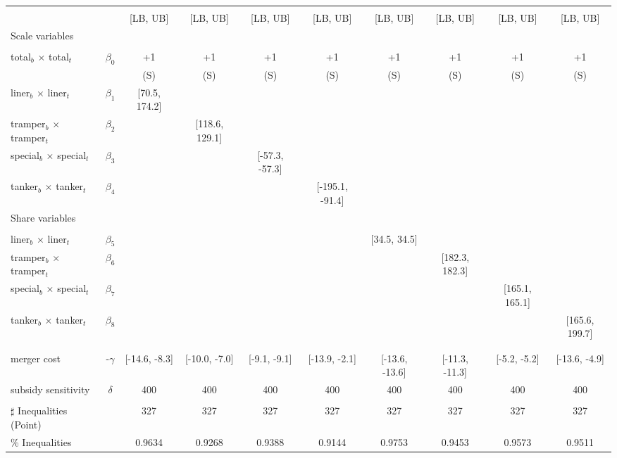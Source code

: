 \begin{tabular}{@{\extracolsep{5pt}}lccccccccc}
\toprule 
 &  &  &  &  &  &  &  &  &  \\
 &  & [LB, UB] & [LB, UB] & [LB, UB] & [LB, UB] & [LB, UB] & [LB, UB] & [LB, UB] & [LB, UB] \\
\midrule 
Scale variables &  &  &  &  &  &  &  \\
 &  &  &  &  &  &  &  &  \\
total$_{b}$ $\times$ total$_{t}$ & $\beta_0$ & +1 & +1 & +1 & +1 & +1 & +1 & +1 & +1 \\
 &  & (S) & (S) & (S) & (S) & (S) & (S) & (S) & (S) \\
liner$_{b}$ $\times$ liner$_{t}$ & $\beta_1$ & [70.5, 174.2] &  &  &  &  &  &  &  \\
tramper$_{b}$ $\times$ tramper$_{t}$ & $\beta_2$ &  & [118.6, 129.1] &  &  &  &  &  &  \\
special$_{b}$ $\times$ special$_{t}$ & $\beta_3$ &  &  & [-57.3, -57.3] &  &  &  &  &  \\
tanker$_{b}$ $\times$ tanker$_{t}$ & $\beta_4$ &  &  &  & [-195.1, -91.4] &  &  &  &  \\
Share variables &  &  &  &  &  &  &  &  &  \\
 &  &  &  &  &  &  &  &  &  \\
liner$_{b}$ $\times$ liner$_{t}$ & $\beta_5$ &  &  &  &  & [34.5, 34.5] &  &  &  \\
tramper$_{b}$ $\times$ tramper$_{t}$ & $\beta_6$ &  &  &  &  &  & [182.3, 182.3] &  &  \\
special$_{b}$ $\times$ special$_{t}$ & $\beta_7$ &  &  &  &  &  &  & [165.1, 165.1] &  \\
tanker$_{b}$ $\times$ tanker$_{t}$ & $\beta_8$ &  &  &  &  &  &  &  & [165.6, 199.7] \\
 &  &  &  &  &  &  &  &  &  \\
 &  &  &  &  &  &  &  &  &  \\
merger cost & -$\gamma$ & [-14.6, -8.3] & [-10.0, -7.0] & [-9.1, -9.1] & [-13.9, -2.1] & [-13.6, -13.6] & [-11.3, -11.3] & [-5.2, -5.2] & [-13.6, -4.9] \\
subsidy sensitivity & $\delta$ & 400 & 400 & 400 & 400 & 400 & 400 & 400 & 400 \\
 &  &  &  &  &  &  &  &  &  \\
\hline 
$\sharp$ Inequalities (Point) &  & 327 & 327 & 327 & 327 & 327 & 327 & 327 & 327 \\
\% Inequalities &  & 0.9634 & 0.9268 & 0.9388 & 0.9144 & 0.9753 & 0.9453 & 0.9573 & 0.9511 \\
\bottomrule 
\end{tabular}
